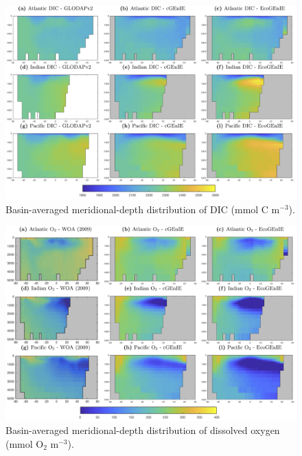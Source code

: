 \documentclass[gmd, manuscript]{copernicus}
\begin{document}
{\begin{figure}[htp]
\includegraphics[width=0.95\linewidth]{Final_figures/Fig_9.png}
\caption{Basin-averaged meridional-depth distribution of DIC (mmol C m$^{-3}$).}
\label{fig:basin_DIC}
\end{figure}



\begin{figure}[htp]
\includegraphics[width=0.95\linewidth]{Final_figures/Fig_10.png}
\caption{Basin-averaged meridional-depth distribution of dissolved oxygen (mmol O$_2$ m$^{-3}$).}
\label{fig:basin_O2}
\end{figure}


}
\end{document}
